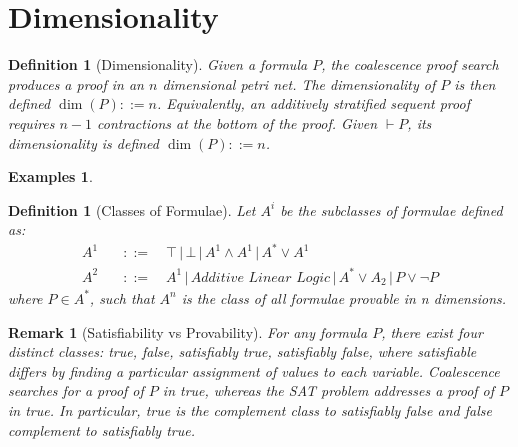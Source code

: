 \documentclass{article}
\def\defeq{::=}
\theoremstyle{indented}
\newtheorem{definition}[sec-ctr]{Definition}
\newtheorem*{examples}{Examples}
\newtheorem*{remark*}{Remark}
\begin{document}


    \section{Dimensionality}
        
        \begin{definition}[Dimensionality]
            Given a formula $P$, the coalescence proof search produces a proof in an $n$ dimensional petri net.
            The dimensionality of $P$ is then defined $\dim(P) \defeq n$.
            Equivalently, an additively stratified sequent proof requires $n - 1$ contractions at the bottom of the proof.
            Given $\vdash P$, its dimensionality is defined $\dim(P) \defeq n$.
        \end{definition}

        \begin{examples}
        \end{examples}


        \begin{definition}[Classes of Formulae]
            Let $A^i$ be the subclasses of formulae defined as:
            \begin{align*}
                A^1 \quad &\defeq \quad \top \,|\, \bot \,|\, A^1 \wedge A^1 \,|\, A^* \vee A^1 \\
                A^2 \quad &\defeq \quad A^1 \,|\, \textit{Additive Linear Logic} \,|\, A^* \vee A_2 \,|\, P \vee \neg P
            \end{align*}
            where $P \in A^*$, such that $A^n$ is the class of all formulae provable in n dimensions.
        \end{definition}


        \begin{remark*}[Satisfiability vs Provability]
            For any formula $P$, there exist four distinct classes: \textit{true, false, satisfiably true, satisfiably false}, where satisfiable differs by finding a particular assignment of values to each variable.
            Coalescence searches for a proof of $P$ in \textit{true}, whereas the SAT problem addresses a proof of $P$ in \textit{true}.
            In particular, \textit{true} is the complement class to \textit{satisfiably false} and \textit{false} complement to \textit{satisfiably true}. %
        \end{remark*}
        
\end{document}
